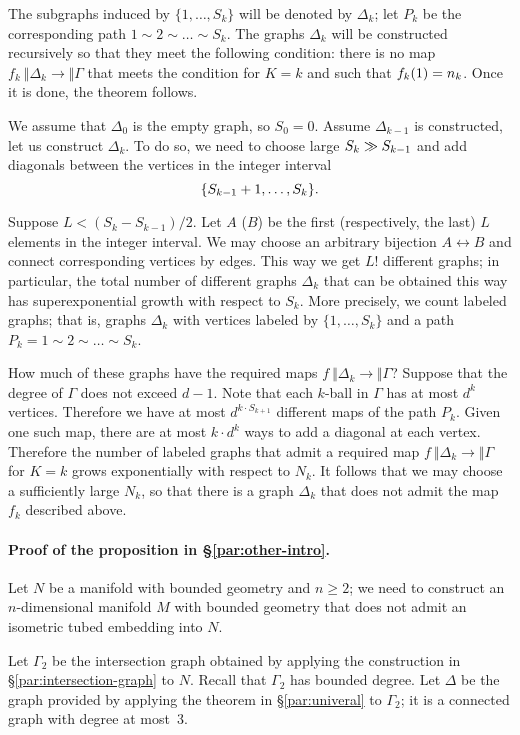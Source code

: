 \documentclass[a4paper,10pt]{article}
\begin{document}
The subgraphs induced by $\{1,\dots, S_k\}$ will be denoted by $\Delta_k$;
let $P_k$ be the corresponding path $1\sim 2\sim \dots \sim S_k$.
The graphs $\Delta_k$ will be constructed recursively so that they meet the following condition:
there is no map $f_k\:\Vert \Delta_k\to \Vert \Gamma$ that meets the condition for $K=k$ and such that $f_k(1)\z=n_k$.
Once it is done, the theorem follows. 

We assume that $\Delta_0$ is the empty graph, so $S_0=0$.
Assume $\Delta_{k-1}$ is constructed, let us  construct $\Delta_k$.
To do so, we need to choose large $S_k\z\gg S_{k-1}$ and add diagonals between the vertices in the integer interval
\[\{S_{k-1}\z+1,\dots,S_k\}.\]

Suppose $L<(S_k-S_{k-1})/2$.
Let $A$ ($B$) be the first (respectively, the last) $L$ elements in the integer interval.
We may choose an arbitrary bijection $A\leftrightarrow B$ and connect corresponding vertices by edges.
This way we get $L!$ different graphs; in particular, the total number of different graphs $\Delta_k$ that can be obtained this way has superexponential growth with respect to $S_k$.
More precisely, we count labeled graphs; that is, graphs $\Delta_k$ with vertices labeled by $\{1,\dots,S_k\}$ and a path $P_k=1\sim 2\sim\dots\sim S_k$.

How much of these graphs have the required maps $f\:\Vert \Delta_k\to \Vert \Gamma$?
Suppose that the degree of $\Gamma$ does not exceed $d-1$.
Note that each $k$-ball in $\Gamma$ has at most $d^k$ vertices.
Therefore we have at most $d^{k\cdot S_{k+1}}$ different maps of the path $P_k$.
Given one such map, there are at most $k\cdot d^k$ ways to add a diagonal at each vertex.
Therefore the number of labeled graphs that admit a required map $f\:\Vert \Delta_k\to \Vert \Gamma$ for $K=k$ grows exponentially with respect to $N_k$.
It follows that we may choose a sufficiently large $N_k$,
so that there is a graph $\Delta_k$ that does not admit the map $f_k$ described above.
\qeds

\paragraph{Proof of the proposition in §\ref{par:other-intro}.}\label{par:other-proof}
Let $N$ be a manifold with bounded geometry and $n\ge 2$;
we need to construct an $n$-dimensional manifold $M$ with bounded geometry that does not admit an isometric tubed embedding into $N$.

Let $\Gamma_2$ be the intersection graph obtained by applying the construction in §\ref{par:intersection-graph} to $N$.
Recall that $\Gamma_2$ has bounded degree.
Let $\Delta$ be the graph provided by applying the theorem in §\ref{par:univeral} to $\Gamma_2$;
it is a connected graph with  degree at most~3.
\end{document}
